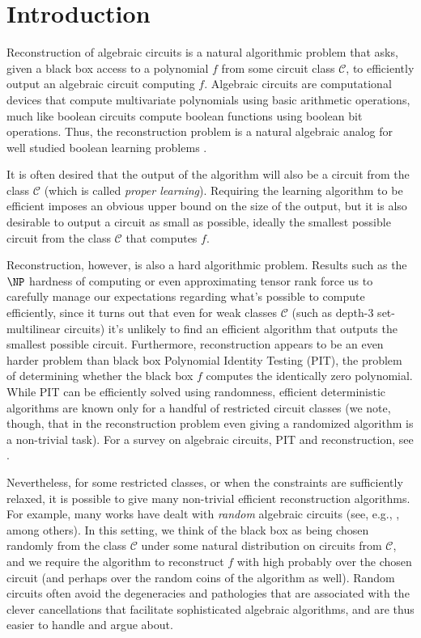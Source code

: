 \documentclass[12pt]{article}
\begin{document}
	\newpage
	
	\tableofcontents
	\newpage
	
	\section{Introduction}
	
	Reconstruction of algebraic circuits is a natural algorithmic problem that asks, given a black box access to a polynomial $f$ from some circuit class $\mathcal{C}$, to efficiently output an algebraic circuit computing $f$. Algebraic circuits are computational devices that compute multivariate polynomials using basic arithmetic operations, much like boolean circuits compute boolean functions using boolean bit operations. Thus, the reconstruction problem is a natural algebraic analog for well studied boolean learning problems \cite{Bshouty13}.
	
	It is often desired that the output of the algorithm will also be a circuit from the class $\mathcal{C}$ (which is called \emph{proper learning}). Requiring the learning algorithm to be efficient imposes an obvious upper bound on the size of the output, but it is also desirable to output a circuit as small as possible, ideally the smallest possible circuit from the class $\mathcal{C}$ that computes $f$.
	
	Reconstruction, however, is also a hard algorithmic problem. Results such as the $\NP$ hardness of computing or even approximating tensor rank \cite{Hastad90, Shitov16, BIJL18, Swernofsky18} force us to carefully manage our expectations regarding what's possible to compute efficiently, since it turns out that even for weak classes $\mathcal{C}$ (such as depth-$3$ set-multilinear circuits) it's unlikely to find an efficient algorithm that outputs the smallest possible circuit. Furthermore, reconstruction appears to be an even harder problem than black box Polynomial Identity Testing (PIT), the problem of determining whether the black box $f$ computes the identically zero polynomial. While PIT can be efficiently solved using randomness, efficient deterministic algorithms are known only for a handful of restricted circuit classes (we note, though, that in the reconstruction problem even giving a randomized algorithm is a non-trivial task). For a survey on algebraic circuits, PIT and reconstruction, see \cite{SY10}.
	
	Nevertheless, for some restricted classes, or when the constraints are sufficiently relaxed, it is possible to give many non-trivial efficient reconstruction algorithms. For example, many works have dealt with \emph{random} algebraic circuits (see, e.g., \cite{GKL11, KNS19, GKS20}, among others). In this setting, we think of the black box as being chosen randomly from the class $\mathcal{C}$ under some natural distribution on circuits from $\mathcal{C}$, and we require the algorithm to reconstruct $f$ with high probably over the chosen circuit (and perhaps over the random coins of the algorithm as well). Random circuits often avoid the degeneracies and pathologies that are associated with the clever cancellations that facilitate sophisticated algebraic algorithms, and are thus easier to handle and argue about.
	
\end{document}
